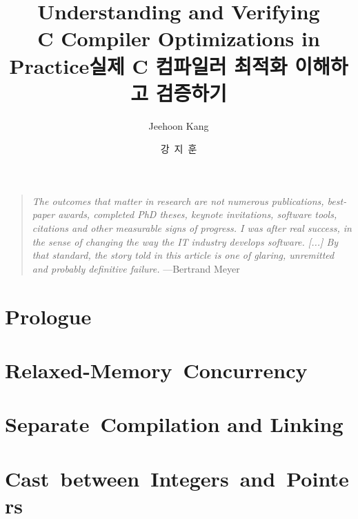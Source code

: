 \documentclass[oneside,phd]{snuthesis}
\title{Understanding and Verifying \\ C Compiler Optimizations in Practice}
\title*{실제 C 컴파일러 최적화 이해하고 검증하기}
\author{Jeehoon Kang}
\author*{강~지~훈} %
\begin{document}
\makefrontcover
\makefrontcover
\makeapproval

\cleardoublepage
{}



\begin{quotation}
  \emph{The outcomes that matter in research are not numerous publications, best-paper awards,
    completed PhD theses, keynote invitations, software tools, citations and other measurable signs
    of progress.  I was after real success, in the sense of changing the way the IT industry
    develops software. [...] By that standard, the story told in this article is one of glaring,
    unremitted and probably definitive failure.} \hfill{}---Bertrand Meyer~\cite{bertrand-meyer}\ \phantom{ }
\end{quotation}



\tableofcontents
\listoffigures

\cleardoublepage
{}


\chapter{Prologue}
\label{chap:prologue}





\chapter{Relaxed-Memory~Concurrency}
\label{chap:relaxed}






% 




\chapter{Separate~Compilation and Linking}
\label{chap:sepcomp}









\chapter{Cast~between~Integers~and~Pointers}
\label{chap:intptrcast}
\end{document}
